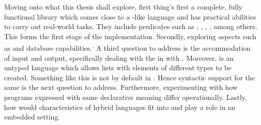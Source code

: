 \documentclass[thesis-solanki.tex]{subfiles}
\begin{document}
Moving onto what this thesis shall explore, first thing's first a complete, fully functional library which comes
close to a -like language and has practical abilities to carry out real-world tasks.
They include predicates such as 
, , , ,  among others.
This forms
the first stage of the implementation.
Secondly, exploring aspects such as  and database capabilities.\textsuperscript{,}
A third question to address is the accommodation of input and output, specifically dealing with the  in  with  .
Moreover,  is an untyped language which allows lists with elements of different types to be
created.
Something like this is not by default in .
Hence syntactic support for the same is the next question to address.
Furthermore, experimenting with how programs expressed with same declarative meaning differ operationally.
Lastly, how would characteristics of hybrid languages fit into and play a role in an embedded setting.
\end{document}

